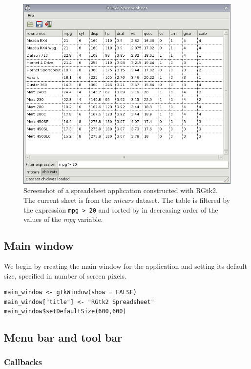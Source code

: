 \documentclass[article]{jss}
\begin{document}
\begin{figure}
\begin{center}
\includegraphics[width=6in]{spreadsheet.png}
\caption{\label{fig:spreadsheet}Screenshot of a spreadsheet
  application constructed with RGtk2. The current sheet is from the
  \emph{mtcars} dataset. The table is filtered by the expression
  \texttt{mpg > 20} and sorted by in decreasing order of the values of the \emph{mpg} variable.}
\end{center}
\end{figure}

\subsection{Main window}

We begin by creating the main window for the application and setting
its default size, specified in number of screen pixels.
\begin{verbatim}
main_window <- gtkWindow(show = FALSE)
main_window["title"] <- "RGtk2 Spreadsheet"
main_window$setDefaultSize(600,600)
\end{verbatim}

\subsection{Menu bar and tool bar}

\subsubsection{Callbacks}
\end{document}
